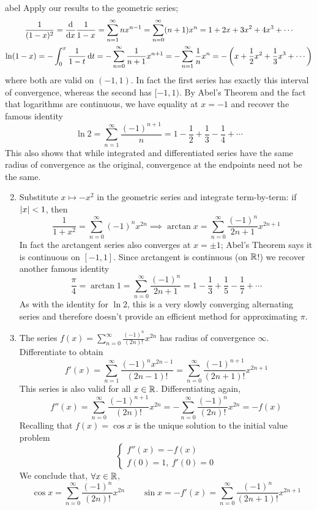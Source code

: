 \begin{examples}{}{abel}
	\exstart{}\label{ex:abel1} Apply our results to the geometric series;
	\begin{gather*}
		\frac 1{(1-x)^2}=\frac{\mathrm{d} }{\mathrm{d} x}\frac 1{1-x}=\sum_{n=1}^\infty nx^{n-1}=\sum_{n=0}^\infty (n+1)x^n=1+2x+3x^2+4x^3+\cdots\\
		\ln(1-x)=-\int_0^x\frac 1{1-t}\,{\mathrm{d} t}= -\sum_{n=0}^\infty\frac 1{n+1}x^{n+1}
	  =-\sum_{n=1}^\infty \frac 1nx^n=-\left(x+\frac 12x^2+\frac 13x^3+\cdots\right)
	\end{gather*}
	where both are valid on $(-1,1)$. In fact the first series has exactly this interval of convergence, whereas the second has $[-1,1)$. By Abel's Theorem and the fact that logarithms are continuous, we have equality at $x=-1$ and recover the famous identity
	\[
		\ln 2=\sum_{n=1}^\infty \frac{(-1)^{n+1}}{n}=1-\frac 12+\frac 13-\frac 14+\cdots
	\]
	This also shows that while integrated and differentiated series have the same radius of convergence as the original, convergence at the endpoints need not be the same.
		
	\begin{enumerate}\setcounter{enumi}{1}  
		\item Substitute $x\mapsto -x^2$ in the geometric series and integrate term-by-term: if $\left| x\right|<1$, then
		\[
			\frac 1{1+x^2}=\sum_{n=0}^\infty(-1)^nx^{2n} 
			\implies  \arctan x=\sum_{n=0}^\infty\frac{(-1)^n}{2n+1}x^{2n+1}
		\]
		In fact the arctangent series also converges at $x=\pm 1$; Abel's Theorem says it is continuous on $[-1,1]$. Since arctangent is continuous (on $\mathbb{R}$!) we recover another famous identity
		\[
			\frac\pi 4=\arctan 1
			=\sum_{n=0}^\infty\frac{(-1)^n}{2n+1}
			=1-\frac 13+\frac 15-\frac 17+\cdots
		\]
		As with the identity for $\ln 2$, this is a very slowly converging alternating series and therefore doesn't provide an efficient method for approximating $\pi$.
	  
	  \item\label{ex:abel3} The series $\displaystyle f(x)=\sum_{n=0}^\infty \frac{(-1)^n}{(2n)!}x^{2n}$ has radius of convergence $\infty$. Differentiate to obtain
		\[
			f'(x)=\sum_{n=1}^\infty \frac{(-1)^nx^{2n-1}}{(2n-1)!}
			=\sum_{n=0}^\infty \frac{(-1)^{n+1}}{(2n+1)!}x^{2n+1}
		\]
		This series is also valid for all $x\in\mathbb{R}$. Differentiating again,
		\[
			f''(x)=\sum_{n=0}^\infty \frac{(-1)^{n+1}}{(2n)!}x^{2n}
			=-\sum_{n=0}^\infty \frac{(-1)^n}{(2n)!}x^{2n}=-f(x)
		\]
		Recalling that $f(x)=\cos x$ is the unique solution to the initial value problem
		\[
			\begin{cases}
				f''(x)=-f(x)\\
				f(0)=1,\ f'(0)=0
			\end{cases}
		\]
		We conclude that, $\forall x\in\mathbb{R}$,
		\[
			\cos x=\sum_{n=0}^\infty \frac{(-1)^n}{(2n)!}x^{2n} 
			\qquad 
			\sin x=-f'(x)=\sum_{n=0}^\infty \frac{(-1)^n}{(2n+1)!}x^{2n+1}
		\]
	\end{enumerate}
\end{examples}

